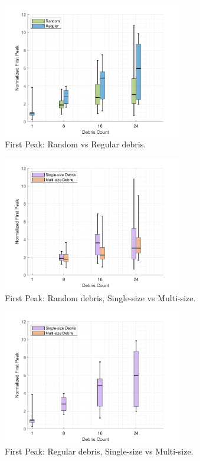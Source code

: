 \documentclass[12pt,a4paper]{article}
\begin{document}
\begin{figure}[h!]
    \centering
    \includegraphics[width=0.7\textwidth]{figures/FirstPeak_Random_vs_Regular.png}
    \caption{First Peak: Random vs Regular debris.}
    \label{fig:FirstPeak_Random_vs_Regular}
\end{figure}

\begin{figure}[h!]
    \centering
    \includegraphics[width=0.7\textwidth]{figures/FirstPeak_Random_Single_vs_Multi.png}
    \caption{First Peak: Random debris, Single-size vs Multi-size.}
    \label{fig:FirstPeak_Random_Single_vs_Multi}
\end{figure}

\begin{figure}[h!]
    \centering
    \includegraphics[width=0.7\textwidth]{figures/FirstPeak_Regular_Single_vs_Multi.png}
    \caption{First Peak: Regular debris, Single-size vs Multi-size.}
    \label{fig:FirstPeak_Regular_Single_vs_Multi}
\end{figure}
\end{document}
